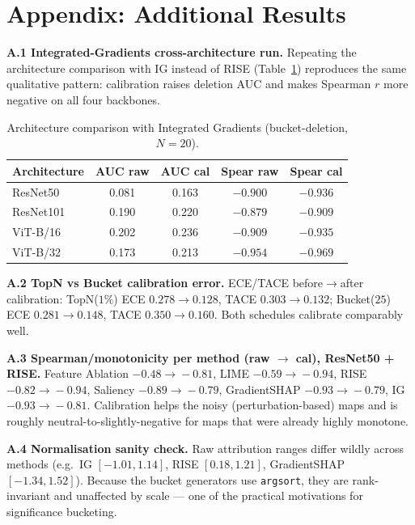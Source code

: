 \documentclass[11pt]{article}
\begin{document}
\appendix
\section{Appendix: Additional Results}

\textbf{A.1 Integrated-Gradients cross-architecture run.} Repeating the
architecture comparison with IG instead of RISE (Table~\ref{tab:arch_ig})
reproduces the same qualitative pattern: calibration raises deletion AUC and
makes Spearman $r$ more negative on all four backbones.

\begin{table}[H]
\centering\small
\caption{Architecture comparison with Integrated Gradients (bucket-deletion,
$N{=}20$).}
\label{tab:arch_ig}
\begin{tabular}{lcccc}
\toprule
Architecture & AUC raw & AUC cal & Spear raw & Spear cal \\
\midrule
ResNet50  & 0.081 & 0.163 & $-0.900$ & $-0.936$ \\
ResNet101 & 0.190 & 0.220 & $-0.879$ & $-0.909$ \\
ViT-B/16  & 0.202 & 0.236 & $-0.909$ & $-0.935$ \\
ViT-B/32  & 0.173 & 0.213 & $-0.954$ & $-0.969$ \\
\bottomrule
\end{tabular}
\end{table}

\textbf{A.2 TopN vs Bucket calibration error.} ECE/TACE before$\to$after
calibration: TopN($1\%$) ECE $0.278\!\to\!0.128$, TACE $0.303\!\to\!0.132$;
Bucket($25$) ECE $0.281\!\to\!0.148$, TACE $0.350\!\to\!0.160$. Both schedules
calibrate comparably well.

\textbf{A.3 Spearman/monotonicity per method (raw $\to$ cal), ResNet50 + RISE.}
Feature Ablation $-0.48\!\to\!-0.81$, LIME $-0.59\!\to\!-0.94$, RISE
$-0.82\!\to\!-0.94$, Saliency $-0.89\!\to\!-0.79$, GradientSHAP
$-0.93\!\to\!-0.79$, IG $-0.93\!\to\!-0.81$. Calibration helps the noisy
(perturbation-based) maps and is roughly neutral-to-slightly-negative for maps
that were already highly monotone.

\textbf{A.4 Normalisation sanity check.} Raw attribution ranges differ wildly
across methods (e.g.\ IG $[-1.01,1.14]$, RISE $[0.18,1.21]$, GradientSHAP
$[-1.34,1.52]$). Because the bucket generators use \texttt{argsort}, they are
rank-invariant and unaffected by scale --- one of the practical motivations for
significance bucketing.

\end{document}
